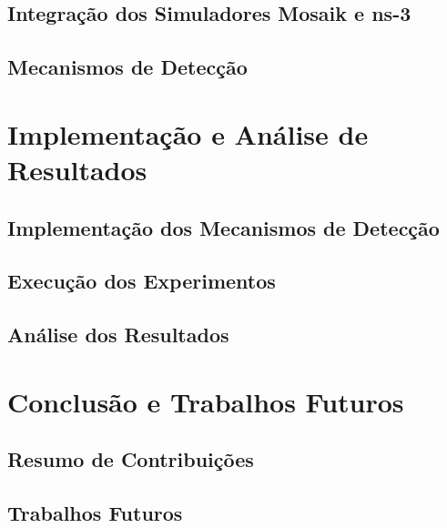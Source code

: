 \documentclass[cic,tc]{iiufrgs}
\begin{document}
\section{Integração dos Simuladores Mosaik e ns-3}
\section{Mecanismos de Detecção}
\chapter{Implementação e Análise de Resultados}
\section{Implementação dos Mecanismos de Detecção}
\section{Execução dos Experimentos}
\section{Análise dos Resultados}
\chapter{Conclusão e Trabalhos Futuros}
\section{Resumo de Contribuições}
\section{Trabalhos Futuros}

% 



\end{document}
